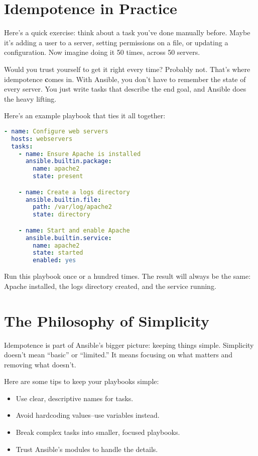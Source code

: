 \section{Idempotence in Practice}

Here's a quick exercise: think about a task you've done manually before. Maybe it's adding a user to a server, setting permissions on a file, or updating a configuration. Now imagine doing it 50 times, across 50 servers.

Would you trust yourself to get it right every time? Probably not. That's where idempotence \textbf{c}omes in. With Ansible, you don't have to remember the state of every server. You just write tasks that describe the end goal, and Ansible does the heavy lifting.

Here's an example playbook that ties it all together:
\begin{lstlisting}[language=yaml, caption=Idempotence in Action]
- name: Configure web servers
  hosts: webservers
  tasks:
    - name: Ensure Apache is installed
      ansible.builtin.package:
        name: apache2
        state: present

    - name: Create a logs directory
      ansible.builtin.file:
        path: /var/log/apache2
        state: directory

    - name: Start and enable Apache
      ansible.builtin.service:
        name: apache2
        state: started
        enabled: yes
\end{lstlisting}

Run this playbook once or a hundred times. The result will always be the same: Apache installed, the logs directory created, and the service running.

\section{The Philosophy of Simplicity}

Idempotence is part of Ansible's bigger picture: keeping things simple. Simplicity doesn't mean “basic” or “limited.” It means focusing on what matters and removing what doesn't.

Here are some tips to keep your playbooks simple:
\begin{itemize}
    \item Use clear, descriptive names for tasks.
    \item Avoid hardcoding values--use variables instead.
    \item Break complex tasks into smaller, focused playbooks.
    \item Trust Ansible's modules to handle the details.
\end{itemize}

